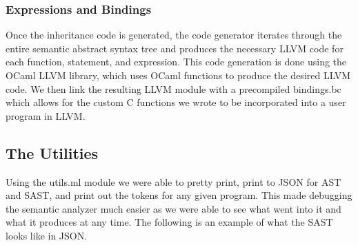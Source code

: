 \begin{homeworkProblem}
	\subsubsection{Expressions and Bindings}
	Once the inheritance code is generated, the code generator iterates through the entire semantic abstract syntax tree and produces the necessary LLVM code for each function, statement, and expression. This code generation is done using the OCaml LLVM library, which uses OCaml functions to produce the desired LLVM code.  We then link the resulting LLVM module with a precompiled bindings.bc which allows for the custom C functions we wrote to be incorporated into a user program in LLVM. 

	\subsection{The Utilities}
	Using the utils.ml module we were able to pretty print, print to JSON for AST and SAST, and print out the tokens for any given program. This made debugging the semantic analyzer much easier as we were able to see what went into it and what it produces at any time. The following is an example of what the SAST looks like in JSON.
	

\end{homeworkProblem}
